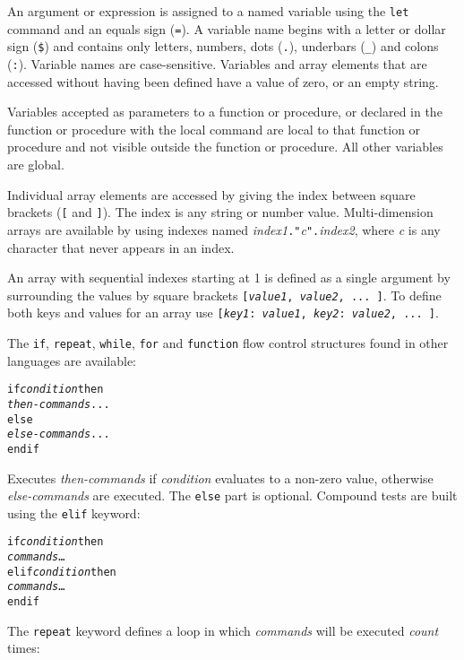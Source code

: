 An argument or expression is assigned to a named variable using the
\texttt{let} command and an equals sign (\texttt{=}).  A variable name begins
with a letter or dollar sign (\texttt{\$}) and contains only letters, numbers,
dots (\texttt{.}), underbars (\texttt{\_}) and colons (\texttt{:}).
Variable names are
case-sensitive.  Variables and array elements that are accessed without having
been defined have a value of zero, or an empty string.

Variables accepted as parameters to a function or procedure, or declared in the
function or procedure with the local command are local to that function or
procedure and not visible outside the function or procedure.  All other
variables are global.

Individual array elements are accessed by giving the index between
square brackets (\texttt{[} and \texttt{]}).
The index is any string or number value.
Multi-dimension arrays are available by using
indexes named \textit{index1}\texttt{."}\textit{c}\texttt{".}\textit{index2},
where \textit{c} is any character that never appears in an index.

An array with sequential indexes starting at 1 is defined as a single
argument by surrounding the values by square brackets
\texttt{[\textit{value1}, \textit{value2}, ... ]}.
To define both keys and values for an array use
\texttt{[\textit{key1}: \textit{value1}, \textit{key2}: \textit{value2}, ... ]}.

The \texttt{if}, \texttt{repeat}, \texttt{while}, \texttt{for}
and \texttt{function} flow control structures
found in other languages are available:

\begin{alltt}
if \textit{condition} then
  \textit{then-commands} ...
else
  \textit{else-commands} ...
endif
\end{alltt}

Executes \textit{then-commands} if \textit{condition} evaluates to
a non-zero value, otherwise \textit{else-commands} are executed.
The \texttt{else} part is optional.
Compound tests are built using the \texttt{elif} keyword:

\begin{alltt}
if \textit{condition} then
  \textit{commands} \dots
elif \textit{condition} then
  \textit{commands} \dots
endif
\end{alltt}

The \texttt{repeat} keyword defines a loop in which
\textit{commands} will be executed \textit{count}
times:


